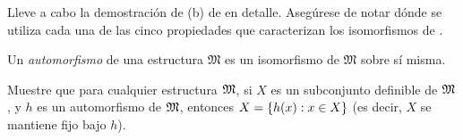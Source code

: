 \documentclass[../../../include/open-logic-section]{subfiles}
\begin{document}
\begin{prob}
Lleve a cabo la demostración de (b) de  en detalle. Asegúrese de notar dónde se utiliza cada una de las cinco propiedades que caracterizan los isomorfismos de .
\end{prob}

\begin{defn}
Un \emph{automorfismo} de una estructura $\mathfrak{M}$ es un isomorfismo de $\mathfrak{M}$ sobre sí misma.
\end{defn}

\begin{prob}
Muestre que para cualquier estructura $\Struct{M}$, si $X$ es un subconjunto definible de $\Struct{M}$, y $h$ es un automorfismo de $\Struct{M}$, entonces $X = \{ h(x) : x \in X \}$ (es decir, $X$ se mantiene fijo bajo $h$).
\end{prob}
\end{document}
